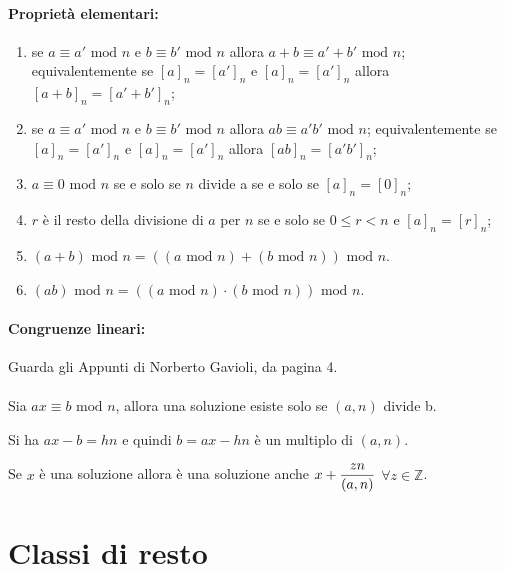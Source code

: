 \documentclass[a4paper]{article}
\begin{document}
        \paragraph{Propriet\`{a} elementari:}
        \begin{enumerate}
                \item se $a \equiv a' \mbox{ mod } n$ e $b \equiv b' \mbox{ mod } n$ allora $a + b \equiv a' + b' \mbox{ mod } n$; equivalentemente se $[a]_n = [a']_n$ e $[a]_n = [a']_n$ allora $[a + b]_n = [a' + b']_n$;
                \item se $a \equiv a' \mbox{ mod } n$ e $b \equiv b' \mbox{ mod } n$ allora $ab \equiv a'b' \mbox{ mod } n$; equivalentemente se $[a]_n = [a']_n$ e $[a]_n = [a']_n$ allora $[ab]_n = [a'b']_n$;
                \item $a \equiv 0 \mbox{ mod } n$ se e solo se $n$ divide a se e solo se $[a]_n =[0]_n$;
                \item $r$ \`{e} il resto della divisione di $a$ per $n$ se e solo se $0 \leq r < n$ e $[a]_n = [r]_n$;
                \item $(a+b) \mbox{ mod } n = (( a \mbox{ mod } n) + (b \mbox{ mod } n)) \mbox{ mod } n$.
                \item $(ab) \mbox{ mod } n= ((a \mbox{ mod } n) \cdot (b \mbox{ mod } n)) \mbox{ mod } n$.
        \end{enumerate}

        \paragraph{Congruenze lineari:}
        Guarda gli Appunti di Norberto Gavioli, da pagina 4.

        \paragraph{}
        Sia $ax \equiv b \mbox{ mod } n$, allora una soluzione esiste solo se $(a,n)$ divide b.

        Si ha $ax - b = hn$  e quindi $b = ax - hn$ \`{e} un multiplo di $(a,n)$.

        Se $x$ \`{e} una soluzione allora \`{e} una soluzione anche $x + \mathlarger{\frac{zn}{(a,n)}}$ $\forall z \in \mathbb{Z}$.


        \section*{Classi di resto}
\end{document}
